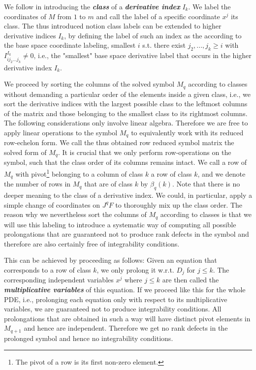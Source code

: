 We follow \cite{seiler1994analysis} in introducing the \textit{\textbf{class}} of a \textit{\textbf{derivative index}} $I_k$. We label the coordinates of $M$ from $1$ to $m$ and call the label of a specific coordinate $x^j$ its class. The thus introduced notion class labels can be extended to higher derivative indices $I_k$, by defining the label of such an index as the according to the base space coordinate labeling, smallest $i$ s.t. there exist $j_2,...,j_k\geq i$ with $I^{I_k}_{ij_2...j_k} \neq 0$, i.e., the "smallest" base space derivative label that occurs in the higher derivative index $I_k$.

We proceed by sorting the columns of the solved symbol $M_q$ according to classes without demanding a particular order of the elements inside a given class, i.e., we sort the derivative indices with the largest possible class to the leftmost columns of the matrix and those belonging to the smallest class to its rightmost columns.
The following considerations only involve linear algebra. Therefore we are free to apply linear operations to the symbol $M_q$ to equivalently work with its reduced row-echelon form. We call the thus obtained row reduced symbol matrix the solved form of $M_q$. 
It is crucial that we only perform row-operations on the symbol, such that the class order of its columns remains intact.
We call a row of $M_q$ with pivot\footnote{The pivot of a row is its first non-zero element.} belonging to a column of class $k$ a row of class $k$, and we denote the number of rows in $M_q$ that are of class $k$ by $\beta_q(k)$. Note that there is no deeper meaning to the class of a derivative index. We could, in particular, apply a simple change of coordinates on $J^qF$ to thoroughly mix up the class order. The reason why we nevertheless sort the columns of $M_q$ according to classes is that we will use this labeling to introduce a systematic way of computing all possible prolongations that are guaranteed not to produce rank defects in the symbol and therefore are also certainly free of integrability conditions.

This can be achieved by proceeding as follows:
Given an equation that corresponds to a row of class $k$, we only prolong it w.r.t. $D_j$ for  $j \leq k$. The corresponding independent variables $x^j$ where $j \leq k$ are then called the \textbf{\textit{multiplicative variables}} of this equation. If we proceed like this for the whole PDE, i.e., prolonging each equation only with respect to its multiplicative variables, we are guaranteed not to produce integrability conditions. All prolongations that are obtained in such a way will have distinct pivot elements in $M_{q+1}$ and hence are independent. Therefore we get no rank defects in the prolonged symbol and hence no integrability conditions.

